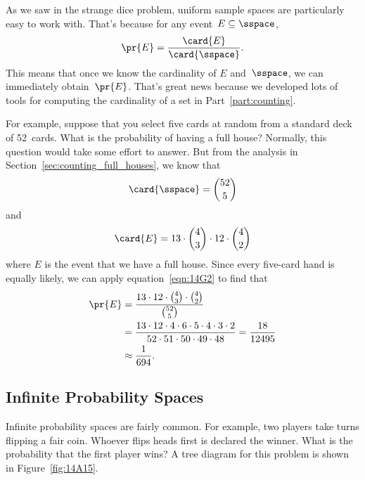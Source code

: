 As we saw in the strange dice problem, uniform sample spaces are
particularly easy to work with.  That's because for any event~$E
\subseteq \sspace$,
\begin{equation}\label{eqn:14G2}
    \pr{E} = \frac{\card{E}}{\card{\sspace}}.
\end{equation}
This means that once we know the cardinality of $E$ and~$\sspace$, we
can immediately obtain~$\pr{E}$.  That's great news because we
developed lots of tools for computing the cardinality of a set in
Part~\ref{part:counting}.

For example, suppose that you select five cards at random from a
standard deck of 52~cards.  What is the probability of having a full
house?  Normally, this question would take some effort to answer.  But
from the analysis in Section~\ref{sec:counting_full_houses}, we know
that
\begin{equation*}
    \card{\sspace} = \binom{52}{5}
\end{equation*}
and
\begin{equation*}
    \card{E} = 13 \cdot \binom{4}{3} \cdot 12 \cdot \binom{4}{2}
\end{equation*}
where $E$ is the event that we have a full house.  Since every
five-card hand is equally likely, we can apply
equation~\eqref{eqn:14G2} to find that
\begin{align*}
\pr{E}  &= \frac{13 \cdot 12 \cdot \binom{4}{3} \cdot \binom{4}{2}}
                {\binom{52}{5}} \\
        &= \frac{13 \cdot 12 \cdot 4 \cdot 6 \cdot 5 \cdot 4 \cdot 3 \cdot 2}
                {52 \cdot 51 \cdot 50 \cdot 49 \cdot 48} = \frac{18}{12495} \\
        &\approx \frac{1}{694}.
\end{align*}

\subsection{Infinite Probability Spaces}

\iffalse
General probability theory deals with uncountable sets like~$\reals$,
but in computer science, it is usually sufficient to restrict our
attention to countable probability spaces.  It's also a lot
easier---infinite sample spaces are hard enough to work with without
having to deal with uncountable spaces.
\fi

Infinite probability spaces are fairly common.  For example, two
players take turns flipping a fair coin.  Whoever flips heads first is
declared the winner.  What is the probability that the first player
wins?  A tree diagram for this problem is shown in
Figure~\ref{fig:14A15}.

